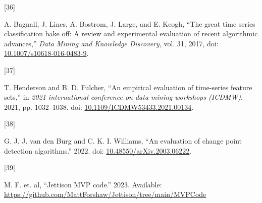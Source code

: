 \documentclass{article}
\newlength{\cslhangindent}
\newlength{\csllabelwidth}
\newlength{\cslentryspacingunit} %
\newenvironment{CSLReferences}[2] %
 {%
  \setlength{\parindent}{0pt}
  \ifodd #1
  \let\oldpar\par
  \def\par{\hangindent=\cslhangindent\oldpar}
  \fi
  \setlength{\parskip}{#2\cslentryspacingunit}
 }%
 {}
\newcommand{\CSLLeftMargin}[1]{\parbox[t]{\csllabelwidth}{#1}}
\newcommand{\CSLRightInline}[1]{\parbox[t]{\linewidth - \csllabelwidth}{#1}\break}
\begin{document}
\begin{CSLReferences}{0}{0}
\leavevmode{}%
\CSLLeftMargin{{[}36{]} }%
\CSLRightInline{A. Bagnall, J. Lines, A. Bostrom, J. Large, and E.
Keogh, {``The great time series classification bake off: A review and
experimental evaluation of recent algorithmic advances,''} \emph{Data
Mining and Knowledge Discovery}, vol. 31, 2017, doi:
\href{https://doi.org/10.1007/s10618-016-0483-9}{10.1007/s10618-016-0483-9}.}

\leavevmode{}%
\CSLLeftMargin{{[}37{]} }%
\CSLRightInline{T. Henderson and B. D. Fulcher, {``An empirical
evaluation of time-series feature sets,''} in \emph{2021 international
conference on data mining workshops (ICDMW)}, 2021, pp. 1032--1038. doi:
\href{https://doi.org/10.1109/ICDMW53433.2021.00134}{10.1109/ICDMW53433.2021.00134}.}

\leavevmode{}%
\CSLLeftMargin{{[}38{]} }%
\CSLRightInline{G. J. J. van den Burg and C. K. I. Williams, {``An
evaluation of change point detection algorithms.''} 2022. doi:
\href{https://doi.org/10.48550/arXiv.2003.06222}{10.48550/arXiv.2003.06222}.}

\leavevmode{}%
\CSLLeftMargin{{[}39{]} }%
\CSLRightInline{M. F. et. al, {``Jettison MVP code.''} 2023. Available:
\url{https://github.com/MattForshaw/Jettison/tree/main/MVPCode}}

\end{CSLReferences}



\end{document}
